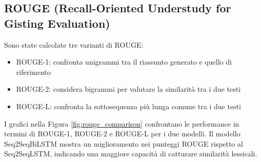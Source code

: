 \documentclass[a4paper, 12pt]{article}
\begin{document}
\subsection{ROUGE (Recall-Oriented Understudy for Gisting Evaluation)}
Sono state calcolate tre varianti di ROUGE:
\begin{itemize}
    \item ROUGE-1: confronta unigrammi tra il riassunto generato e quello di riferimento
    \item ROUGE-2: considera bigrammi per valutare la similarità tra i due testi
    \item ROUGE-L: confronta la sottosequenza più lunga comune tra i due testi
\end{itemize}    

I grafici nella Figura \ref{fig:rouge_comparison} confrontano le performance in termini di ROUGE-1, ROUGE-2 e ROUGE-L per i due modelli. Il modello Seq2SeqBiLSTM mostra un miglioramento nei punteggi ROUGE rispetto al Seq2SeqLSTM, indicando una maggiore capacità di catturare similarità lessicali.
\end{document}

